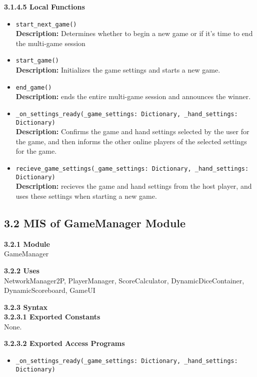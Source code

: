 \documentclass[12pt, titlepage]{article}
\begin{document}
\textbf{3.1.4.5 Local Functions}
\begin{itemize}
    \item \texttt{start\_next\_game()}\\
	\textbf{Description:} Determines whether to begin a new game or if it's time to end the multi-game session 
    
    \item \texttt{start\_game()}\\
    \textbf{Description:} Initializes the game settings and starts a new game.
    
    \item \texttt{end\_game()}\\
    \textbf{Description:} ends the entire multi-game session and announces the winner.
    
    \item \texttt{\_on\_settings\_ready(\_game\_settings: Dictionary, \_hand\_settings: Dictionary)}\\
    \textbf{Description:} Confirms the game and hand settings selected by the user for the game, and then informs the other online players of the selected settings for the game.
    
    \item \texttt{recieve\_game\_settings(\_game\_settings: Dictionary, \_hand\_settings: Dictionary)}\\
    \textbf{Description:} recieves the game and hand settings from the host player, and uses these settings when starting a new game.
    
\end{itemize}

\subsection*{3.2 MIS of GameManager Module}
\textbf{3.2.1 Module}\\
GameManager

\textbf{3.2.2 Uses}\\
NetworkManager2P, PlayerManager, ScoreCalculator, DynamicDiceContainer, DynamicScoreboard, GameUI

\textbf{3.2.3 Syntax}\\
\textbf{3.2.3.1 Exported Constants}\\
None.  

\textbf{3.2.3.2 Exported Access Programs}
\begin{itemize}
    \item \texttt{\_on\_settings\_ready(\_game\_settings: Dictionary, \_hand\_settings: Dictionary)}
\end{itemize}
\end{document}
